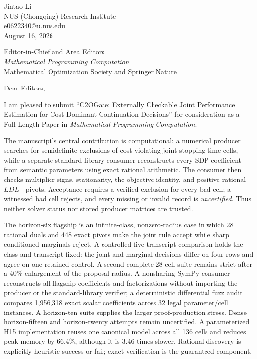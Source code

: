 \documentclass[10pt]{letter}
\begin{document}
\begin{flushright}
Jintao Li\\
NUS (Chongqing) Research Institute\\
\href{mailto:e0622340@u.nus.edu}{e0622340@u.nus.edu}\\[0.4em]
August 16, 2026
\end{flushright}

Editor-in-Chief and Area Editors\\
\textit{Mathematical Programming Computation}\\
Mathematical Optimization Society and Springer Nature

Dear Editors,

I am pleased to submit ``C2OGate: Externally Checkable Joint Performance Estimation
for Cost-Dominant Continuation Decisions'' for consideration as a Full-Length
Paper in \textit{Mathematical Programming Computation}.

The manuscript's central contribution is computational: a numerical producer
searches for semidefinite exclusions of cost-violating joint stopping-time
cells, while a separate standard-library consumer reconstructs every SDP
coefficient from semantic parameters using exact rational arithmetic.  The
consumer then checks multiplier signs, stationarity, the objective identity,
and positive rational $LDL^\top$ pivots.  Acceptance requires a verified
exclusion for every bad cell; a witnessed bad cell rejects, and every missing
or invalid record is \emph{uncertified}.  Thus neither solver status nor stored
producer matrices are trusted.

The horizon-six flagship is an infinite-class, nonzero-radius case in which 28
rational duals and 448 exact pivots make the joint rule accept while sharp
conditioned marginals reject.  A controlled five-transcript comparison holds
the class and transcript fixed: the joint and marginal decisions differ on
four rows and agree on one retained control.  A second complete 28-cell suite remains strict
after a 40\% enlargement of the proposal radius.  A nonsharing SymPy consumer
reconstructs all flagship coefficients and factorizations without importing
the producer or the standard-library verifier; a deterministic differential
fuzz audit compares 1,956,318 exact scalar coefficients across 32 legal
parameter/cell instances.  A horizon-ten suite supplies the larger
proof-production stress.  Dense horizon-fifteen and horizon-twenty attempts
remain uncertified.  A parameterized H15 implementation reuses one canonical
model across all 136 cells and reduces peak memory by 66.4\%, although it is
3.46 times slower.  Rational discovery is explicitly heuristic
success-or-fail; exact verification is the guaranteed component.
\end{document}
